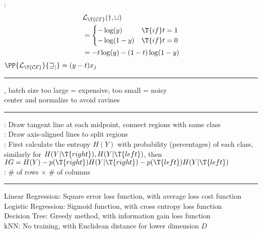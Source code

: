 \documentclass[10pt]{CheatSheet/hw}
\begin{document}
\begin{multicols*}{5}
: \begin{align*}
    &\cal{L}_{\T{CE}}(y,t)\\
    &=\begin{cases}
        -\log(y) & \T{if } t=1\\
        -\log(1-y) & \T{if } t=0
    \end{cases}\\
    &= -t\log(y)-(1-t)\log(1-y)
\end{align*}
$\PP{\cal{L}_{\T{CE}}}{w_j}=(y-t)x_j$\\
\rule{\linewidth}{0.4pt}
, batch size too large = expensive, too small = noisy\\
center and normalize to avoid ravines\\
\rule{\linewidth}{0.4pt}
: Draw tangent line at each midpoint, connect regions with same class\\
: Draw axis-aligned lines to split regions\\
: First calculate the entropy $H(Y)$ with probability (percentages) of each class, similarly for $H(Y|\T{right}),H(Y|\T{left})$, then $IG=H(Y)-p(\T{right})H(Y|\T{right})-p(\T{left})H(Y|\T{left})$\\
: \# of rows $\times$ \# of columns\\
\rule{\linewidth}{0.4pt}
Linear Regression: Square error loss function, with average loss cost function\\
Logistic Regression: Sigmoid function, with cross entropy loss function\\
Decision Tree: Greedy method, with information gain loss function\\
kNN: No training, with Euclidean distance for lower dimension $D$\\


\end{multicols*}
\end{document}
